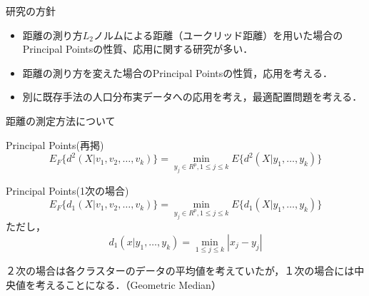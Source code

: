 \documentclass[unicode,11pt]{beamer}
\begin{document}
\begin{frame}{研究の方針}
    \begin{itemize}
        \item 距離の測り方$L_2$ノルムによる距離（ユークリッド距離）を用いた場合のPrincipal Pointsの性質、応用に関する研究が多い．
        \item 距離の測り方を変えた場合のPrincipal Pointsの性質，応用を考える．
        \item 別に既存手法の人口分布実データへの応用を考え，最適配置問題を考える．
    \end{itemize}
\end{frame}

\begin{frame}{距離の測定方法について}
    \begin{block}{Principal Points(再掲)}
        \begin{equation}
            E_F\{d^2(X|v_1,v_2,\dots,v_k)\} = \min_{y_j \in R^p, 1\le j \le k} E\{d^2(X|y_1,\dots, y_k)\}
        \end{equation}
    \end{block}

    \begin{block}{Principal Points(1次の場合)}
        \begin{equation}
            E_F\{d_1(X|v_1,v_2,\dots,v_k)\} = \min_{y_j \in R^p, 1\le j \le k} E\{d_1(X|y_1,\dots, y_k)\}
        \end{equation}
        ただし，
        \begin{equation}
            d_1(x|y_1,\dots,y_k) = \min_{1\le j \le k}{|x_j - y_j|}
        \end{equation}
    \end{block}
    ２次の場合は各クラスターのデータの平均値を考えていたが，１次の場合には中央値を考えることになる．（Geometric Median）
\end{frame}
\end{document}
